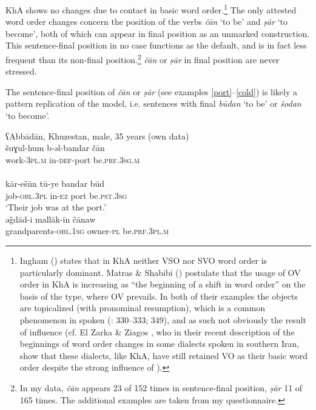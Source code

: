 \documentclass[output=paper,nonflat]{langsci/langscibook}
\begin{document}
KhA shows no changes due to contact in basic {word order}.\footnote{Ingham (\citeyear[715]{Ingham1991}) states that in KhA neither VSO nor SVO {word order} is particularly dominant. Matras \& Shabibi (\citeyear[147]{MatrasShabibi2007}) postulate that the usage of OV order in KhA is increasing as “the beginning of a shift in {word order}” on the basis of the  type, where OV prevails. In both of their examples the objects are topicalized (with pronominal resumption), which is a common phenomenon in spoken  (\citealt{Brustad2000}: 330–333; 349), and as such not obviously the result of  influence (cf. El Zarka \& Ziagos \citeyear{ElZarkaZiagos2019}, who in their recent description of the beginnings of {word order} changes in some  dialects spoken in southern Iran, show that these dialects, like KhA, have still retained VO as their basic {word order} despite the strong influence of ).}  The only attested {word order} changes concern the position of the verbs \textit{čān} ‘to be’ and \textit{ṣār} ‘to become’, both of which can appear in final position as an unmarked construction. This sentence-final position in no case functions as the default, and is in fact less frequent than its non-final position.\footnote{In my data, \textit{čān} appears 23 of 152 times in sentence-final position, \textit{ṣār} 11 of 165 times. The additional examples are taken from my questionnaire.} \textit{čān} or \textit{ṣār} in final position are never stressed.\largerpage[2]

The sentence-final position of \textit{čān} or \textit{ṣār} (see examples \ref{port}--\ref{cold}) is likely a pattern {replication} of the  model, i.e. sentences with final \textit{būdan} ‘to be’ or \textit{šodan} ‘to become’.

\ea\label{port}
\ea
{ʕAbbādān, Khuzestan, male, 35 years (own data)}\\
\gll šuɣul-hum b-əl-bandar čān\\
     work-\textsc{3pl}.\textsc{m} in-\textsc{def}-port be.\textsc{prf.3sg.m}\\
 
\\
\gll kār-ešūn tū-ye bandar būd\\
     job-\textsc{obl}.3\textsc{pl} in-\textsc{ez} port be.\textsc{pst.3sg}\\
\glt ‘Their job was at the port.’
\z\ex
{}\\
\gll əǧdād-i mallāk-īn čānaw\\
     grandparents-\textsc{obl.1sg} owner-\textsc{pl} be.\textsc{prf.3pl.m}\\
 
\end{document}
